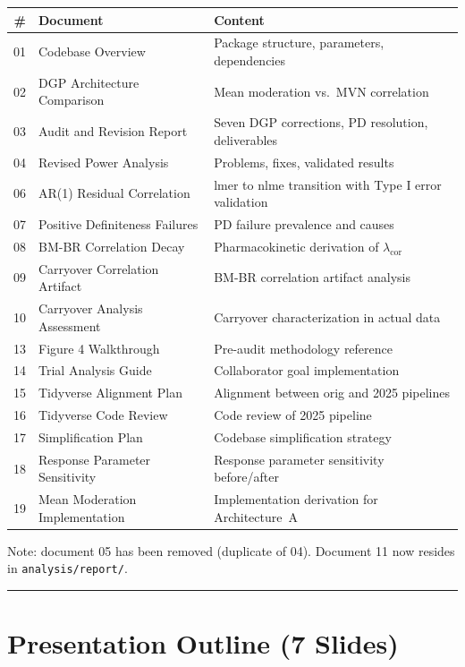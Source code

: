 \documentclass[11pt]{article}
\begin{document}
\begin{table}[h]
\centering
\small
\begin{tabular}{rll}
\toprule
\# & Document & Content \\
\midrule
01 & Codebase Overview & Package structure, parameters, dependencies \\
02 & DGP Architecture Comparison & Mean moderation vs.\ MVN correlation \\
03 & Audit and Revision Report & Seven DGP corrections, PD resolution, deliverables \\
04 & Revised Power Analysis & Problems, fixes, validated results \\
06 & AR(1) Residual Correlation & lmer to nlme transition with Type I error validation \\
07 & Positive Definiteness Failures & PD failure prevalence and causes \\
08 & BM-BR Correlation Decay & Pharmacokinetic derivation of $\lambda_{\text{cor}}$ \\
09 & Carryover Correlation Artifact & BM-BR correlation artifact analysis \\
10 & Carryover Analysis Assessment & Carryover characterization in actual data \\
13 & Figure 4 Walkthrough & Pre-audit methodology reference \\
14 & Trial Analysis Guide & Collaborator goal implementation \\
15 & Tidyverse Alignment Plan & Alignment between orig and 2025 pipelines \\
16 & Tidyverse Code Review & Code review of 2025 pipeline \\
17 & Simplification Plan & Codebase simplification strategy \\
18 & Response Parameter Sensitivity & Response parameter sensitivity before/after \\
19 & Mean Moderation Implementation & Implementation derivation for Architecture~A \\
\bottomrule
\end{tabular}
\end{table}

Note: document 05 has been removed (duplicate of 04).
Document 11 now resides in \texttt{analysis/report/}.

\bigskip\noindent\rule{\textwidth}{0.4pt}\bigskip

\section{Presentation Outline (7 Slides)}
\end{document}
